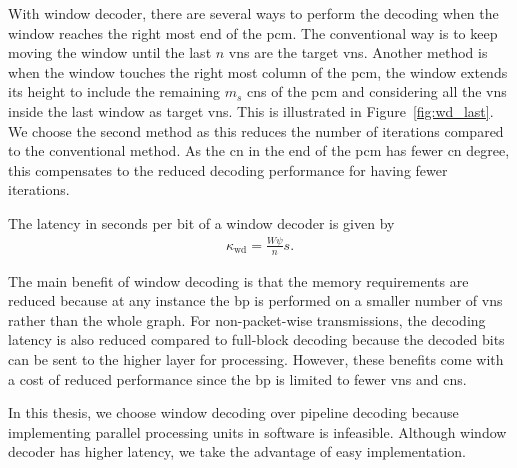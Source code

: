 With window decoder, there are several ways to perform the decoding when the window reaches the right most end of the \ac{pcm}. The conventional way is to keep moving the window until the last $n$ \acp{vn} are the target \acp{vn}. Another method is when the window touches the right most column of the \ac{pcm}, the window extends its height to include the remaining $m_s$ \acp{cn} of the \ac{pcm} and considering all the \acp{vn} inside the last window as target \acp{vn}. This is illustrated in Figure~\ref{fig:wd_last}. We choose the second method as this reduces the number of iterations compared to the conventional method. As the \ac{cn} in the end of the \ac{pcm} has fewer \ac{cn} degree, this compensates to the reduced decoding performance for having fewer iterations.

The latency in seconds per bit of a window decoder is given by
\begin{align}
\kappa_{\text{wd}}=\frac{W\psi}{n}s.
\end{align}

The main benefit of window decoding is that the memory requirements are reduced because at any instance the \ac{bp} is performed on a smaller number of \acp{vn} rather than the whole graph. For non-packet-wise transmissions, the decoding latency is also reduced compared to full-block decoding because the decoded bits can be sent to the higher layer for processing. However, these benefits come with a cost of reduced performance since the \ac{bp} is limited to fewer \acp{vn} and \acp{cn}.

In this thesis, we choose window decoding over pipeline decoding because implementing parallel processing units in software is infeasible. Although window decoder has higher latency, we take the advantage of easy implementation.

